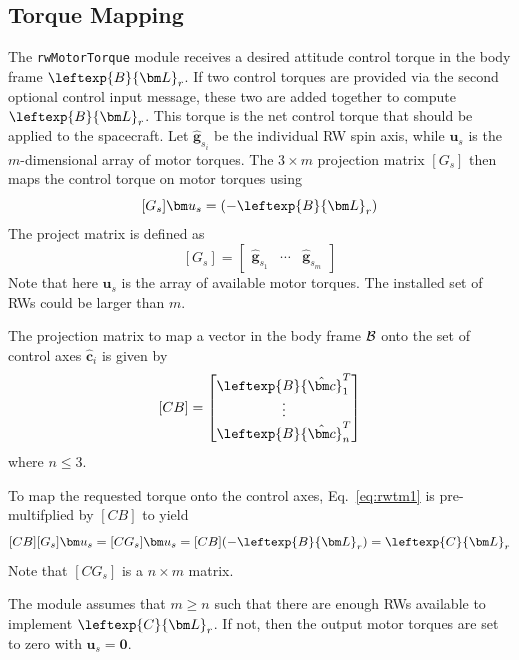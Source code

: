 \subsection{Torque Mapping}
The {\tt rwMotorTorque} module receives a desired attitude control torque in the body frame $\leftexp{B}{\bm L}_r$. If two control torques are provided via the second optional control input message, these two are added together to compute $\leftexp{B}{\bm L}_r$. This torque is the net control torque that should be applied to the spacecraft. Let $\hat{\bm g}_{s_{i}}$ be the individual RW spin axis, while $\bm u_{s}$ is the $m$-dimensional array of motor torques.  The $3\times m$ projection matrix $[G_{s}]$ then maps the control torque on motor torques using
\begin{equation}
	\label{eq:rwtm1}
	[G_{s}] \bm u_{s} = (-\leftexp{B}{\bm L}_r)
\end{equation}
The project matrix is defined as
\begin{equation}
	\label{eq:rwtm2}
	[G_{s}] = \begin{bmatrix}
		\hat{\bm g}_{s_{1}} & \cdots & \hat{\bm g}_{s_{m}}
	\end{bmatrix}
\end{equation}
Note that here $\bm u_{s}$ is the array of available motor torques.  The installed set of RWs could be larger than $m$.

The projection matrix to map a vector in the body frame $\cal B$ onto the set of control axes $\hat{\bm c}_{i}$ is given by
\begin{equation}
	\label{eq:rwtm3}
	[CB] = \begin{bmatrix}
		\leftexp{B}{\hat{\bm c}}_{1}^{T}
		\\
		\vdots \\
		\leftexp{B}{\hat{\bm c}}_{n}^{T}
	\end{bmatrix}
\end{equation}
where $n \le 3$.

To map the requested torque onto the control axes, Eq.~\eqref{eq:rwtm1} is pre-multifplied by $[CB]$ to yield
\begin{equation}
	\label{eq:rwtm4}
	[CB][G_{s}] \bm u_{s} = [CG_{s}] \bm u_{s} = [CB](-\leftexp{B}{\bm L}_r) = \leftexp{C}{\bm L}_{r}
\end{equation}
Note that $[CG_{s}]$ is a $n\times m$ matrix.

The module assumes that $m\ge n$ such that there are enough RWs available to implement $ \leftexp{C}{\bm L}_{r}$.  If not, then the output motor torques are set to zero with $\bm u_{s} = \bm 0$.

